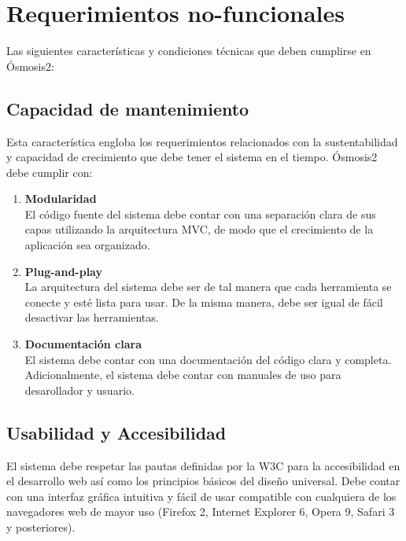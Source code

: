 \section{Requerimientos no-funcionales}
Las siguientes características y condiciones técnicas que deben cumplirse en Ósmosis2:

\subsection{Capacidad de mantenimiento}
Esta característica engloba los requerimientos relacionados con la sustentabilidad y capacidad de crecimiento que debe tener el sistema en el tiempo. Ósmosis2 debe cumplir con:
\begin{enumerate}
	\item \textbf{Modularidad}\\
	El código fuente del sistema debe contar con una separación clara de sus capas utilizando la arquitectura MVC, de modo que el crecimiento de la aplicación sea organizado.
	\item \textbf{Plug-and-play} \\
	La arquitectura del sistema debe ser de tal manera que cada herramienta se conecte y esté lista para usar. De la misma manera, debe ser igual de fácil desactivar las herramientas.
	\item \textbf{Documentación clara}\\
	El sistema debe contar con una documentación del código clara y completa. Adicionalmente, el sistema debe contar con manuales de uso para desarollador y usuario.
\end{enumerate}

\subsection{Usabilidad y Accesibilidad}
El sistema debe respetar las pautas definidas por la W3C para la accesibilidad en el desarrollo web así como los principios básicos del diseño universal. Debe contar con una interfaz gráfica intuitiva y fácil de usar compatible con cualquiera de los navegadores web de mayor uso (Firefox 2, Internet Explorer 6, Opera 9, Safari 3 y posteriores).

